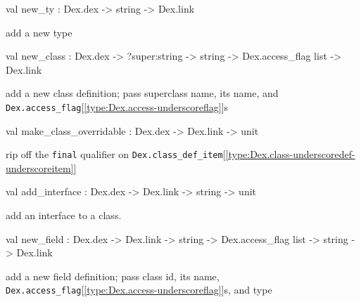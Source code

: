 \documentclass[11pt]{article}
\begin{document}
\label{val:Modify.new-underscorety}\begin{ocamldoccode}
val new_ty : Dex.dex -> string -> Dex.link
\end{ocamldoccode}
\begin{ocamldocdescription}
add a new type


\end{ocamldocdescription}




\label{val:Modify.new-underscoreclass}\begin{ocamldoccode}
val new_class :
  Dex.dex -> ?super:string -> string -> Dex.access_flag list -> Dex.link
\end{ocamldoccode}
\begin{ocamldocdescription}
add a new class definition;
 pass superclass name, its name, and {\tt{Dex.access\_flag}}[\ref{type:Dex.access-underscoreflag}]s


\end{ocamldocdescription}




\label{val:Modify.make-underscoreclass-underscoreoverridable}\begin{ocamldoccode}
val make_class_overridable : Dex.dex -> Dex.link -> unit
\end{ocamldoccode}
\begin{ocamldocdescription}
rip off the {\tt{final}} qualifier on {\tt{Dex.class\_def\_item}}[\ref{type:Dex.class-underscoredef-underscoreitem}]


\end{ocamldocdescription}




\label{val:Modify.add-underscoreinterface}\begin{ocamldoccode}
val add_interface : Dex.dex -> Dex.link -> string -> unit
\end{ocamldoccode}
\begin{ocamldocdescription}
add an interface to a class.


\end{ocamldocdescription}




\label{val:Modify.new-underscorefield}\begin{ocamldoccode}
val new_field :
  Dex.dex -> Dex.link -> string -> Dex.access_flag list -> string -> Dex.link
\end{ocamldoccode}
\begin{ocamldocdescription}
add a new field definition;
 pass class id, its name, {\tt{Dex.access\_flag}}[\ref{type:Dex.access-underscoreflag}]s, and type


\end{ocamldocdescription}
\end{document}
